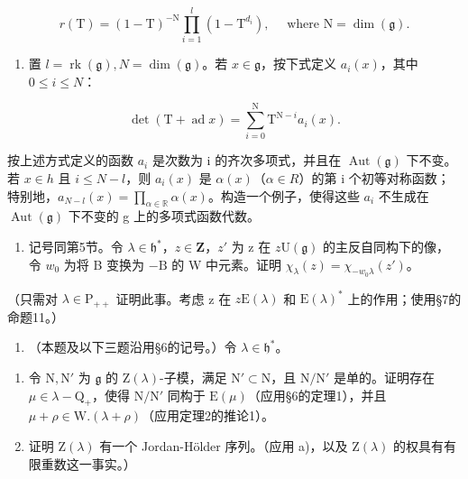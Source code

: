 \[
r (\mathrm{T}) = (1 - \mathrm{T}) ^ {- \mathrm{N}} \prod_ {i = 1} ^ {l} (1 - \mathrm{T} ^ {d _ {i}}), \quad \text { where } \mathrm{N} = \dim (\mathfrak {g}).
\]

\begin{enumerate}
\def\labelenumi{\arabic{enumi})}
\setcounter{enumi}{7}
\tightlist
\item
  置 \(l = \operatorname{rk}(\mathfrak{g}), N = \dim(\mathfrak{g})\)。若 \(x \in \mathfrak{g}\)，按下式定义 \(a_i(x)\)，其中 \(0 \leq i \leq N\)：
\end{enumerate}

\[
\det (\mathrm{T} + \operatorname{ad} x) = \sum_ {i = 0} ^ {\mathrm{N}} \mathrm{T} ^ {\mathrm{N} - i} a _ {i} (x).
\]

按上述方式定义的函数 \(a_{i}\) 是次数为 i 的齐次多项式，并且在 \(\operatorname{Aut}(\mathfrak{g})\) 下不变。若 \(x \in h\) 且 \(i \leq N - l\)，则 \(a_{i}(x)\) 是 \(\alpha(x)\)（\(\alpha \in R\)）的第 i 个初等对称函数；特别地，\(a_{N-l}(x) = \prod_{\alpha \in \mathbb{R}} \alpha(x)\)。构造一个例子，使得这些 \(a_{i}\) 不生成在 \(\operatorname{Aut}(\mathfrak{g})\) 下不变的 g 上的多项式函数代数。

\begin{enumerate}
\def\labelenumi{\arabic{enumi})}
\setcounter{enumi}{8}
\tightlist
\item
  记号同第5节。令 \(\lambda \in \mathfrak{h}^*\)，\(z \in \mathbf{Z}\)，\(z'\) 为 z 在 \(z\)\(\mathrm{U}(\mathfrak{g})\) 的主反自同构下的像，令 \(w_0\) 为将 B 变换为 \(-\mathrm{B}\) 的 W 中元素。证明 \(\chi_{\lambda}(z) = \chi_{-w_0\lambda}(z')\)。
\end{enumerate}

（只需对 \(\lambda \in \mathrm{P}_{++}\) 证明此事。考虑 z 在 \(z\)\(\mathrm{E}(\lambda)\) 和 \(\mathrm{E}(\lambda)^*\) 上的作用；使用§7的命题11。）

\begin{enumerate}
\def\labelenumi{\arabic{enumi})}
\setcounter{enumi}{9}
\tightlist
\item
  （本题及以下三题沿用§6的记号。）令 \(\lambda \in \mathfrak{h}^*\)。
\end{enumerate}

\begin{enumerate}
\def\labelenumi{\alph{enumi})}
\tightlist
\item
  令 \(\mathrm{N}, \mathrm{N}'\) 为 \(\mathfrak{g}\) 的 \(\mathrm{Z}(\lambda)\)-子模，满足 \(\mathrm{N}' \subset \mathrm{N}\)，且 \(\mathrm{N} / \mathrm{N}'\) 是单的。证明存在 \(\mu \in \lambda - \mathrm{Q}_+\)，使得 \(\mathrm{N} / \mathrm{N}'\) 同构于 \(\mathrm{E}(\mu)\)（应用§6的定理1），并且 \(\mu + \rho \in \mathrm{W}.(\lambda + \rho)\)（应用定理2的推论1）。
\item
  证明 \(\mathrm{Z}(\lambda)\) 有一个 Jordan-Hölder 序列。（应用 a)，以及 \(\mathrm{Z}(\lambda)\) 的权具有有限重数这一事实。）
\end{enumerate}

